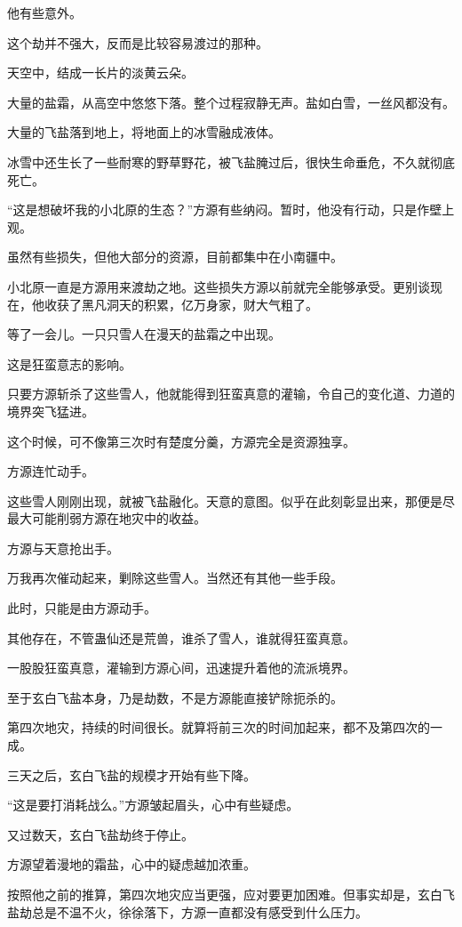 \begin{this_body}
他有些意外。

这个劫并不强大，反而是比较容易渡过的那种。

天空中，结成一长片的淡黄云朵。

大量的盐霜，从高空中悠悠下落。整个过程寂静无声。盐如白雪，一丝风都没有。

大量的飞盐落到地上，将地面上的冰雪融成液体。

冰雪中还生长了一些耐寒的野草野花，被飞盐腌过后，很快生命垂危，不久就彻底死亡。

“这是想破坏我的小北原的生态？”方源有些纳闷。暂时，他没有行动，只是作壁上观。

虽然有些损失，但他大部分的资源，目前都集中在小南疆中。

小北原一直是方源用来渡劫之地。这些损失方源以前就完全能够承受。更别谈现在，他收获了黑凡洞天的积累，亿万身家，财大气粗了。

等了一会儿。一只只雪人在漫天的盐霜之中出现。

这是狂蛮意志的影响。

只要方源斩杀了这些雪人，他就能得到狂蛮真意的灌输，令自己的变化道、力道的境界突飞猛进。

这个时候，可不像第三次时有楚度分羹，方源完全是资源独享。

方源连忙动手。

这些雪人刚刚出现，就被飞盐融化。天意的意图。似乎在此刻彰显出来，那便是尽最大可能削弱方源在地灾中的收益。

方源与天意抢出手。

万我再次催动起来，剿除这些雪人。当然还有其他一些手段。

此时，只能是由方源动手。

其他存在，不管蛊仙还是荒兽，谁杀了雪人，谁就得狂蛮真意。

一股股狂蛮真意，灌输到方源心间，迅速提升着他的流派境界。

至于玄白飞盐本身，乃是劫数，不是方源能直接铲除扼杀的。

第四次地灾，持续的时间很长。就算将前三次的时间加起来，都不及第四次的一成。

三天之后，玄白飞盐的规模才开始有些下降。

“这是要打消耗战么。”方源皱起眉头，心中有些疑虑。

又过数天，玄白飞盐劫终于停止。

方源望着漫地的霜盐，心中的疑虑越加浓重。

按照他之前的推算，第四次地灾应当更强，应对要更加困难。但事实却是，玄白飞盐劫总是不温不火，徐徐落下，方源一直都没有感受到什么压力。


\end{this_body}
